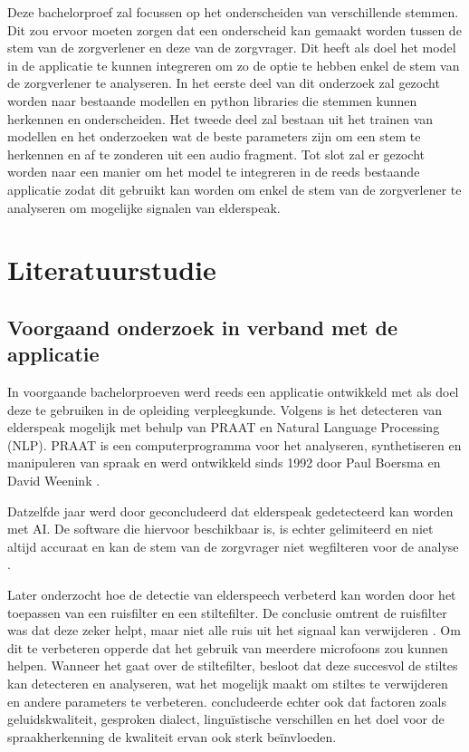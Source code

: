 Deze bachelorproef zal focussen op het onderscheiden van verschillende stemmen. Dit zou ervoor moeten zorgen dat een onderscheid kan gemaakt worden tussen de stem van de zorgverlener en deze van de zorgvrager. Dit heeft als doel het model in de applicatie te kunnen integreren om zo de optie te hebben enkel de stem van de zorgverlener te analyseren. In het eerste deel van dit onderzoek zal gezocht worden naar bestaande modellen en python libraries die stemmen kunnen herkennen en onderscheiden. Het tweede deel zal bestaan uit het trainen van modellen en het onderzoeken wat de beste parameters zijn om een stem te herkennen en af te zonderen uit een audio fragment. Tot slot zal er gezocht worden naar een manier om het model te integreren in de reeds bestaande applicatie zodat dit gebruikt kan worden om enkel de stem van de zorgverlener te analyseren om mogelijke signalen van elderspeak.


\section{Literatuurstudie}%
\label{sec:literatuurstudie}

\subsection{Voorgaand onderzoek in verband met de applicatie}%

In voorgaande bachelorproeven werd reeds een applicatie ontwikkeld met als doel deze te gebruiken in de opleiding verpleegkunde. Volgens \textcite{Govaerts2022} is het detecteren van elderspeak mogelijk met behulp van PRAAT en Natural Language Processing (NLP). PRAAT is een computerprogramma voor het analyseren, synthetiseren en manipuleren van spraak en werd ontwikkeld sinds 1992 door Paul Boersma en David Weenink \autocite{Govaerts2022}.

Datzelfde jaar werd door \textcite{Gussem2022} geconcludeerd dat elderspeak gedetecteerd kan worden met AI. De software die hiervoor beschikbaar is, is echter gelimiteerd en niet altijd accuraat en kan de stem van de zorgvrager niet wegfilteren voor de analyse \autocite{Gussem2022}.

Later onderzocht \textcite{Daems2023} hoe de detectie van elderspeech verbeterd kan worden door het toepassen van een ruisfilter en een stiltefilter. De conclusie omtrent de ruisfilter was dat deze zeker helpt, maar niet alle ruis uit het signaal kan verwijderen \autocite{Daems2023}. Om dit te verbeteren opperde \textcite{Daems2023} dat het gebruik van meerdere microfoons zou kunnen helpen.
Wanneer het gaat over de stiltefilter, besloot \textcite{Daems2023} dat deze succesvol de stiltes kan detecteren en analyseren, wat het mogelijk maakt om stiltes te verwijderen en andere parameters te verbeteren. \textcite{Daems2023} concludeerde echter ook dat factoren zoals geluidskwaliteit, gesproken dialect, linguïstische verschillen en het doel voor de spraakherkenning de kwaliteit ervan ook sterk beïnvloeden.

